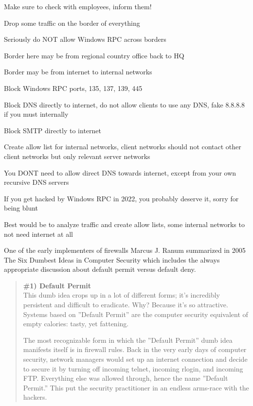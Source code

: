 \documentclass[Screen16to9,17pt]{foils}
\begin{document}
Make sure to check with employees, inform them!


\begin{list2}
\item Drop some traffic on the border of everything
\item Seriously do NOT allow Windows RPC across borders
\item Border here may be from regional country office back to HQ
\item Border may be from internet to internal networks
\item Block Windows RPC ports, 135, 137, 139, 445
\item Block DNS directly to internet, do not allow clients to use any DNS, fake 8.8.8.8 if you must internally
\item Block SMTP directly to internet
\item Create allow list for internal networks, client networks should not contact other client networks but only relevant server networks
\end{list2}

You DONT need to allow direct DNS towards internet, except from your own recursive DNS servers

If you get hacked by Windows RPC in 2022, you probably deserve it, sorry for being blunt

Best would be to analyze traffic and create allow lists, some internal networks to not need internet at all




One of the early implementers of firewalls Marcus J. Ranum summarized in 2005 The Six Dumbest Ideas in Computer Security  which includes the always appropriate discussion about default permit versus default deny.

\begin{quote}\small {\bf
\#1) Default Permit}\\
This dumb idea crops up in a lot of different forms; it’s incredibly persistent and difficult to eradicate. Why? Because it’s so attractive. Systems based on ”Default Permit” are the computer security equivalent of empty calories: tasty, yet fattening.

The most recognizable form in which the ”Default Permit” dumb idea manifests itself is in firewall rules. Back in the very early days of computer security, network managers would set up an internet connection and decide to secure it by turning off incoming telnet, incoming rlogin, and incoming FTP. Everything else was allowed through, hence the name ”Default Permit.” This put the security practitioner in an endless arms-race with the hackers.
\end{quote}
\end{document}

